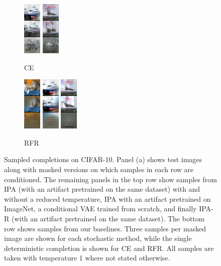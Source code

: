 \begin{figure}[t]
\begin{subfigure}[t]{0.08\textwidth}
      \includegraphics[height=\cifarimgheight]{figs/cigcvae/image-samples/cifar10/freeform_ce_1_samples}
      \includegraphics[height=\cifarimgheight]{figs/cigcvae/image-samples/cifar10/freeform_ce_3_samples}
      \caption{CE}
    \end{subfigure}
    \begin{subfigure}[t]{0.08\textwidth}
      \centering
      \includegraphics[height=\cifarimgheight]{figs/cigcvae/image-samples/cifar10/freeform_rfr_0_samples}
      \includegraphics[height=\cifarimgheight]{figs/cigcvae/image-samples/cifar10/freeform_rfr_1_samples}
      \includegraphics[height=\cifarimgheight]{figs/cigcvae/image-samples/cifar10/freeform_rfr_3_samples}
      \caption{RFR}
    \end{subfigure}
    \caption{Sampled completions on CIFAR-10. Panel (a) shows test images along
      with masked versions on which samples in each row are conditioned. The
      remaining panels in the top row show samples from IPA (with an artifact
      pretrained on the same dataset) with and without a reduced temperature,
      IPA with an artifact pretrained on ImageNet, a conditional VAE trained
      from scratch, and finally IPA-R (with an artifact pretrained on the same
      dataset). The bottom row shows samples from our baselines. Three samples
      per masked image are shown for each stochastic method, while the single
      deterministic completion is shown for CE and RFR. All samples are taken
      with temperature 1 where not stated otherwise.}
    \label{fig:cigcvae-cifar-samples-0}
  \end{figure}


